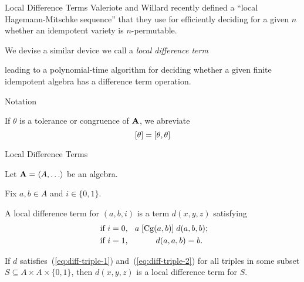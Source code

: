 \documentclass[notes=hide,12pt,xcolor=dvipsnames%
   ]{beamer}
\renewcommand{\cite}[1]{\relax}
\renewcommand{\defn}[1]{\alert{#1}}
\newcommand{\bigpause}{\pause\bigskip}
\begin{document}
\begin{frame}[label=local-diff-term-defs,shrink=5]{Local Difference Terms}
Valeriote and Willard recently defined %
a ``local Hagemann-Mitschke sequence'' that they use for
efficiently deciding for a given $n$ whether an idempotent
variety is $n$-permutable. 

  \bigskip

  We devise a similar device we call a \emph{\alert{local difference term}}

  leading to a polynomial-time
  algorithm for deciding whether a given finite idempotent algebra
  has a difference term operation.

\end{frame}

\begin{frame}[label=local-diff-term-defs,shrink]{Notation}

  If $\theta$ is a tolerance or congruence of $\mathbf{A}$, we abreviate
  {\Large  \[
  [\theta]= [\theta, \theta]
  \]}
\vfill
\end{frame}


\begin{frame}[label=local-diff-term-defs,shrink]{Local Difference Terms}

  Let $\bA=\< A, \dots\>$ be an algebra.

  Fix $a, b \in A$ and $i \in \{0,1\}$.

  A \defn{local difference term for $(a,b,i)$} is a term $d(x,y,z)$ satisfying
  \begin{align}
    \text{ if $i=0$, } \; & \; a \mathrel{[\operatorname{Cg}(a,b)]} d(a,b,b); \label{eq:diff-triple-1}\\
    \text{ if $i=1$, } \; & \hskip1cm d(a,a,b) = b. \label{eq:diff-triple-2}
  \end{align}

  \bigpause
  If $d$ satisfies~(\ref{eq:diff-triple-1}) and~(\ref{eq:diff-triple-2}) for all triples
  in some subset $S\subseteq A \times A \times \{0,1\}$, then $d(x,y,z)$ is a
  \defn{local difference term for $S$}.
\end{frame}
\end{document}
